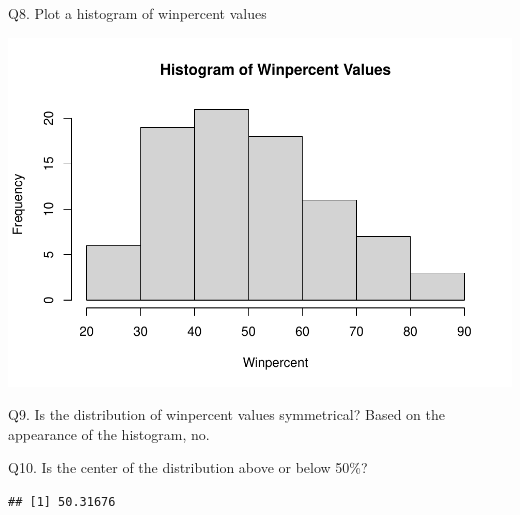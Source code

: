 \documentclass[
]{article}
\newenvironment{Shaded}{\begin{snugshade}}{\end{snugshade}}
\newcommand{\AttributeTok}[1]{\textcolor[rgb]{0.13,0.29,0.53}{#1}}
\newcommand{\FunctionTok}[1]{\textcolor[rgb]{0.13,0.29,0.53}{\textbf{#1}}}
\newcommand{\NormalTok}[1]{#1}
\newcommand{\SpecialCharTok}[1]{\textcolor[rgb]{0.81,0.36,0.00}{\textbf{#1}}}
\newcommand{\StringTok}[1]{\textcolor[rgb]{0.31,0.60,0.02}{#1}}
\begin{document}
Q8. Plot a histogram of winpercent values

\begin{Shaded}
\end{Shaded}

\includegraphics{Untitled1_files/figure-latex/unnamed-chunk-11-1.pdf}

Q9. Is the distribution of winpercent values symmetrical? Based on the
appearance of the histogram, no.

Q10. Is the center of the distribution above or below 50\%?

\begin{Shaded}
\end{Shaded}

\begin{verbatim}
## [1] 50.31676
\end{verbatim}

\begin{Shaded}
\end{Shaded}
\end{document}
